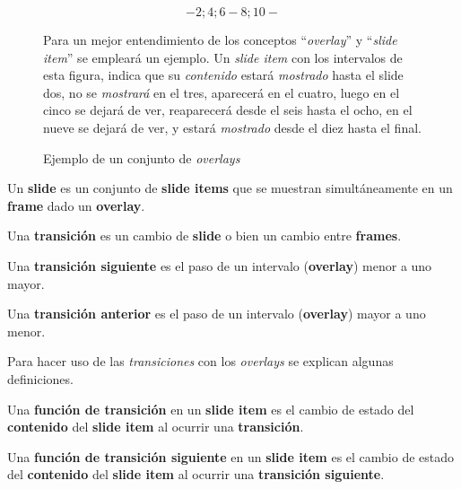 		\begin{figure}[htb]%
			\centering
			$$-2; 4; 6-8; 10-$$
			\caption{Ejemplo de un conjunto de \textit{overlays}} 
			\label{fig:overlay_set}
			\small

		Para un mejor entendimiento de los conceptos ``\textit{overlay}'' y ``\textit{slide item}'' se empleará un ejemplo. Un \textit{slide item} con los intervalos de esta figura, indica que su \textit{contenido} estará \textit{mostrado} hasta el slide dos, no se \textit{mostrará} en el tres, aparecerá en el cuatro, luego en el cinco se dejará de ver, reaparecerá desde el seis hasta el ocho, en el nueve se dejará de ver, y estará \textit{mostrado} desde el diez hasta el final. 			
		\end{figure}

 		\begin{definition}
 		\label{def:slide}
 			Un \textbf{slide} es un conjunto de \textbf{slide items} que se muestran simultáneamente en un \textbf{frame} dado un \textbf{overlay}.
 		\end{definition}

 		\begin{definition}
 		\label{def:transition}
 			Una \textbf{transición} es un cambio de \textbf{slide} o bien un cambio entre \textbf{frames}.
 		\end{definition}

 		\begin{definition}
 		\label{def:next_transition}
 			Una \textbf{transición siguiente} es el paso de un intervalo (\textbf{overlay}) menor a uno mayor.
 		\end{definition} 		

 		\begin{definition}
 		\label{def:prev_transition}
 			Una \textbf{transición anterior} es el paso de un intervalo (\textbf{overlay}) mayor a uno menor.
 		\end{definition}

		Para hacer uso de las \textit{transiciones} con los \textit{overlays} se explican algunas definiciones.

		\begin{definition}
		\label{def:transition_func}
			Una \textbf{función de transición} en un \textbf{slide item} es el cambio de estado del \textbf{contenido} del \textbf{slide item} al ocurrir una \textbf{transición}.
		\end{definition}

		\begin{definition}
		\label{def:next_transition_func}
			Una \textbf{función de transición siguiente} en un \textbf{slide item} es el cambio de estado del \textbf{contenido} del \textbf{slide item} al ocurrir una \textbf{transición siguiente}.
		\end{definition}

